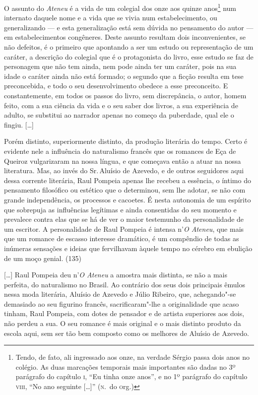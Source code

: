 O assunto do \textit{Ateneu}
é a vida de um colegial dos onze aos quinze anos\footnote{Tendo, de
fato, ali ingressado aos onze, na verdade Sérgio passa dois anos no
colégio. As duas marcações temporais mais importantes são dadas no
3º parágrafo do capítulo \textsc{i}, ``Eu tinha onze anos'', e
no 1º parágrafo do capítulo \textsc{viii}, ``No ano
seguinte [\ldots]'' (\textsc{n}.~do \textsc{o}rg.)} num internato daquele nome
e a vida que se vivia num estabelecimento, ou generalizando --- e esta
generalização está sem dúvida no pensamento do autor --- em
estabelecimentos congêneres. Deste assunto resultam dois
inconvenientes, se não defeitos, é o primeiro que apontando a ser um
estudo ou representação de um caráter, a descrição do colegial que é o
protagonista do livro, esse estudo se faz de personagem que não tem
ainda, nem pode ainda ter um caráter, pois na sua idade o caráter ainda
não está formado; o segundo que a ficção resulta em tese preconcebida,
e todo o seu desenvolvimento obedece a esse preconceito. E
constantemente, em todos os passos do livro, sem discrepância, o autor,
homem feito, com a sua ciência da vida e o seu saber dos livros, a sua
experiência de adulto, se substitui ao narrador apenas no começo da
puberdade, qual ele o fingiu.
[\ldots] 

Porém distinto, superiormente distinto, da produção
literária do tempo. Certo é evidente nele a influência do naturalismo
francês que os romances de Eça de Queiroz vulgarizaram na nossa língua,
e que começava então a atuar na nossa literatura. Mas, ao invés do Sr.\,Aluísio de Azevedo, e de outros seguidores aqui dessa corrente
literária, Raul Pompeia apenas lhe recebeu a essência, o íntimo do
pensamento filosófico ou estético que o determinou, sem lhe adotar, se
não com grande independência, os processos e cacoetes. É nesta
autonomia de um espírito que sobrepuja as influências legítimas e ainda
consentidas do seu momento e prevalece contra elas que se há de ver o
maior testemunho da personalidade de um escritor. A personalidade de
Raul Pompeia é intensa n'\textit{O Ateneu},
que mais que um romance de escasso interesse dramático, é um compêndio
de todas as inúmeras sensações e ideias que fervilhavam àquele tempo no
cérebro em ebulição de um moço genial.  (135)


\smallskip

[\ldots] Raul Pompeia deu n'\textit{O Ateneu} a amostra mais distinta, se não a mais
perfeita, do naturalismo no Brasil. Ao contrário dos seus dois
principais êmulos nessa moda literária, Aluísio de Azevedo e Júlio
Ribeiro, que, achegando"-se demasiado ao seu figurino francês,
sacrificaram"-lhe a originalidade que acaso tinham, Raul Pompeia, com
dotes de pensador e de artista superiores aos dois, não perdeu a sua. O
seu romance é mais original e o mais distinto produto da escola aqui,
sem ser tão bem composto como os melhores de Aluísio de Azevedo. 


